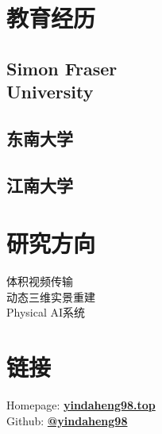 \documentclass[]{deedy-resume-openfont}
\begin{document}

\begin{minipage}[t]{0.23\textwidth}

\section{教育经历}
\subsection{Simon Fraser\\University}

\subsection{东南大学}

\subsection{江南大学}

\section{研究方向}
\textbullet{} 体积视频传输 \\
\textbullet{} 动态三维实景重建 \\
\textbullet{} Physical AI系统 \\

\section{链接}
Homepage: \href{https://www.yindaheng98.top}{\bf yindaheng98.top} \\
Github: \href{https://github.com/yindaheng98}{\bf @yindaheng98}

\end{minipage}
\hfill
\end{document}
